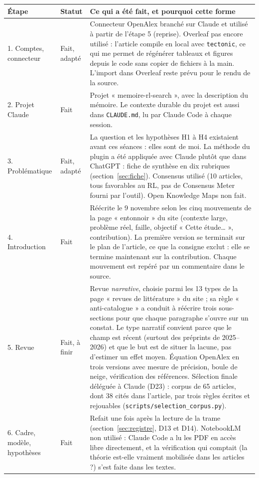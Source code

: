 \documentclass[10pt,a4paper]{article}
\newcommand{\f}[1]{\texttt{\small #1}}
\begin{document}
\small
\begin{longtable}{@{}P{1.9cm}P{2.6cm}P{11.2cm}@{}}
\toprule
Étape & Statut & Ce qui a été fait, et pourquoi cette forme\\
\midrule{}. Comptes, connecteur & Fait, adapté & Connecteur OpenAlex branché sur Claude et utilisé à partir de l'étape 5 (reprise). Overleaf pas encore utilisé : l'article compile en local avec \f{tectonic}, ce qui me permet de régénérer tableaux et figures depuis le code sans copier de fichiers à la main. L'import dans Overleaf reste prévu pour le rendu de la source.\\
2. Projet Claude & Fait & Projet « memoire-rl-search », avec la description du mémoire. Le contexte durable du projet est aussi dans \f{CLAUDE.md}, lu par Claude Code à chaque session.\\
3. Problématique & Fait, adapté & La question et les hypothèses H1 à H4 existaient avant ces séances : elles sont de moi. La méthode du plugin a été appliquée avec Claude plutôt que dans ChatGPT : fiche de synthèse en dix rubriques (section~\ref{sec:fiche}). Consensus utilisé (10 articles, tous favorables au RL, pas de Consensus Meter fourni par l'outil). Open Knowledge Maps non fait.\\
4. Introduction & Fait & Réécrite le 9 novembre selon les cinq mouvements de la page « entonnoir » du site (contexte large, problème réel, faille, objectif « Cette étude… », contribution). La première version se terminait sur le plan de l'article, ce que la consigne exclut : elle se termine maintenant sur la contribution. Chaque mouvement est repéré par un commentaire dans le source.\\
5. Revue & Fait, à finir & Revue \emph{narrative}, choisie parmi les 13 types de la page « revues de littérature » du site ; sa règle « anti-catalogue » a conduit à réécrire trois sous-sections pour que chaque paragraphe s'ouvre sur un constat. Le type narratif convient parce que le champ est récent (surtout des préprints de 2025--2026) et que le but est de situer la lacune, pas d'estimer un effet moyen. Équation OpenAlex en trois versions avec mesure de précision, boule de neige, vérification des références. Sélection finale déléguée à Claude (D23) : corpus de 65 articles, dont 38 cités dans l'article, par trois règles écrites et rejouables (\f{scripts/selection\_corpus.py}).\\
6. Cadre, modèle, hypothèses & Fait & Refait une fois après la lecture de la trame (section~\ref{sec:registre}, D13 et D14). NotebookLM non utilisé : Claude Code a lu les PDF en accès libre directement, et la vérification qui comptait (la théorie est-elle vraiment mobilisée dans les articles ?) s'est faite dans les textes.\\

\end{longtable}
\end{document}
